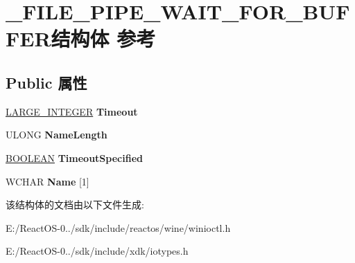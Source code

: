 \hypertarget{struct___f_i_l_e___p_i_p_e___w_a_i_t___f_o_r___b_u_f_f_e_r}{}\section{\+\_\+\+F\+I\+L\+E\+\_\+\+P\+I\+P\+E\+\_\+\+W\+A\+I\+T\+\_\+\+F\+O\+R\+\_\+\+B\+U\+F\+F\+E\+R结构体 参考}
\label{struct___f_i_l_e___p_i_p_e___w_a_i_t___f_o_r___b_u_f_f_e_r}
\subsection*{Public 属性}
\begin{DoxyCompactItemize}
\item 
\mbox{\label{struct___f_i_l_e___p_i_p_e___w_a_i_t___f_o_r___b_u_f_f_e_r_a2dea038b644eb1200f6aec80733d2dda}} 
\hyperlink{union___l_a_r_g_e___i_n_t_e_g_e_r}{L\+A\+R\+G\+E\+\_\+\+I\+N\+T\+E\+G\+ER} {\bfseries Timeout}
\item 
\mbox{\label{struct___f_i_l_e___p_i_p_e___w_a_i_t___f_o_r___b_u_f_f_e_r_abdfde8336f542ae5899b7e6910a9e550}} 
U\+L\+O\+NG {\bfseries Name\+Length}
\item 
\mbox{\label{struct___f_i_l_e___p_i_p_e___w_a_i_t___f_o_r___b_u_f_f_e_r_aa2b8384f4d6d9b70673e2836ea13125f}} 
\hyperlink{_processor_bind_8h_a112e3146cb38b6ee95e64d85842e380a}{B\+O\+O\+L\+E\+AN} {\bfseries Timeout\+Specified}
\item 
\mbox{\label{struct___f_i_l_e___p_i_p_e___w_a_i_t___f_o_r___b_u_f_f_e_r_a6e64849c6adbf985fb03d5ae7e265383}} 
W\+C\+H\+AR {\bfseries Name} \mbox{[}1\mbox{]}
\end{DoxyCompactItemize}


该结构体的文档由以下文件生成\+:\begin{DoxyCompactItemize}
\item 
E\+:/\+React\+O\+S-\/0../sdk/include/reactos/wine/winioctl.\+h\item 
E\+:/\+React\+O\+S-\/0../sdk/include/xdk/iotypes.\+h\end{DoxyCompactItemize}

